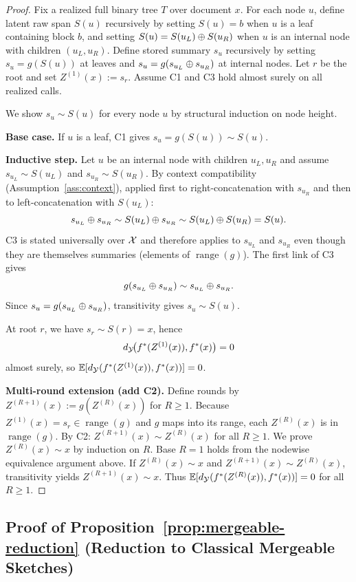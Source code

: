 \begin{proof}
Fix a realized full binary tree $T$ over document $x$.
For each node $u$, define latent raw span $S(u)$ recursively by setting $S(u) = b$ when $u$ is a leaf containing block $b$, and setting $S(u) = S(u_L) \oplus S(u_R)$ when $u$ is an internal node with children $(u_L, u_R)$.
Define stored summary $s_u$ recursively by setting $s_u = g(S(u))$ at leaves and $s_u = g(s_{u_L} \oplus s_{u_R})$ at internal nodes.
Let $r$ be the root and set $Z^{(1)}(x) := s_r$.
Assume C1 and C3 hold almost surely on all realized calls.

We show $s_u \sim S(u)$ for every node $u$ by structural induction on node height.

\textbf{Base case.} If $u$ is a leaf, C1 gives $s_u = g(S(u)) \sim S(u)$.

\textbf{Inductive step.} Let $u$ be an internal node with children $u_L, u_R$ and assume $s_{u_L} \sim S(u_L)$ and $s_{u_R} \sim S(u_R)$.
By context compatibility (Assumption~\ref{ass:context}), applied first to right-concatenation with $s_{u_R}$ and then to left-concatenation with $S(u_L)$:
\[
s_{u_L} \oplus s_{u_R} \sim S(u_L) \oplus s_{u_R} \sim S(u_L) \oplus S(u_R) = S(u).
\]
C3 is stated universally over $\mathcal{X}$ and therefore applies to $s_{u_L}$ and $s_{u_R}$ even though they are themselves summaries (elements of $\operatorname{range}(g)$). The first link of C3 gives
\[
g(s_{u_L} \oplus s_{u_R}) \sim s_{u_L} \oplus s_{u_R}.
\]
Since $s_u = g(s_{u_L} \oplus s_{u_R})$, transitivity gives $s_u \sim S(u)$.

At root $r$, we have $s_r \sim S(r) = x$, hence
\[
d_{\mathcal{Y}}\!\big(f^\ast(Z^{(1)}(x)), f^\ast(x)\big) = 0
\]
almost surely, so $\mathbb{E}[d_{\mathcal{Y}}(f^\ast(Z^{(1)}(x)), f^\ast(x))] = 0$.

\textbf{Multi-round extension (add C2).}
Define rounds by $Z^{(R+1)}(x) := g(Z^{(R)}(x))$ for $R \ge 1$.
Because $Z^{(1)}(x) = s_r \in \operatorname{range}(g)$ and $g$ maps into its range, each $Z^{(R)}(x)$ is in $\operatorname{range}(g)$.
By C2: $Z^{(R+1)}(x) \sim Z^{(R)}(x)$ for all $R \ge 1$.
We prove $Z^{(R)}(x) \sim x$ by induction on $R$.
Base $R = 1$ holds from the nodewise equivalence argument above.
If $Z^{(R)}(x) \sim x$ and $Z^{(R+1)}(x) \sim Z^{(R)}(x)$, transitivity yields $Z^{(R+1)}(x) \sim x$.
Thus $\mathbb{E}[d_{\mathcal{Y}}(f^\ast(Z^{(R)}(x)), f^\ast(x))] = 0$ for all $R \ge 1$.
\end{proof}

\subsection{Proof of Proposition~\ref{prop:mergeable-reduction} (Reduction to Classical Mergeable Sketches)}\label{app:proof-mergeable}

